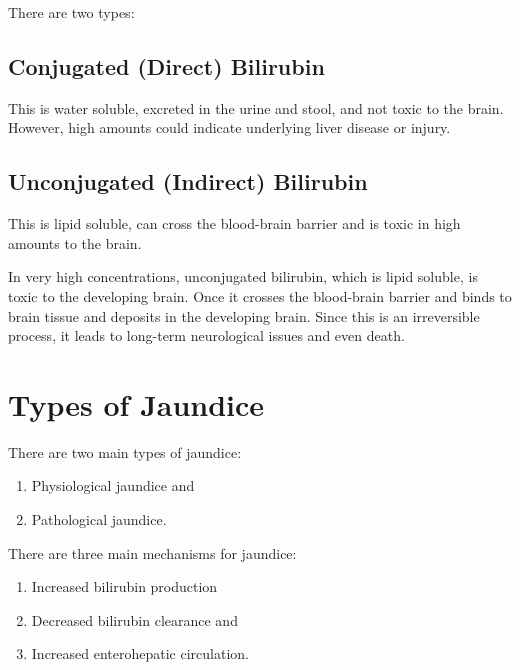 \documentclass[
  letterpaper,
  DIV=11,
  numbers=noendperiod]{scrreprt}
\providecommand{\tightlist}{%
  \setlength{\itemsep}{0pt}\setlength{\parskip}{0pt}}\usepackage{longtable,booktabs,array}
\begin{document}
There are two types:

\hypertarget{conjugated-direct-bilirubin}{%
\subsection{Conjugated (Direct)
Bilirubin}\label{conjugated-direct-bilirubin}}

This is water soluble, excreted in the urine and stool, and not toxic to
the brain. However, high amounts could indicate underlying liver disease
or injury.

\hypertarget{unconjugated-indirect-bilirubin}{%
\subsection{Unconjugated (Indirect)
Bilirubin}\label{unconjugated-indirect-bilirubin}}

This is lipid soluble, can cross the blood-brain barrier and is toxic in
high amounts to the brain.

In very high concentrations, unconjugated bilirubin, which is lipid
soluble, is toxic to the developing brain. Once it crosses the
blood-brain barrier and binds to brain tissue and deposits in the
developing brain. Since this is an irreversible process, it leads to
long-term neurological issues and even death.

\hypertarget{types-of-jaundice}{%
\section{Types of Jaundice}\label{types-of-jaundice}}

There are two main types of jaundice:\\

\begin{enumerate}
\def\labelenumi{\arabic{enumi}.}
\tightlist
\item
  Physiological jaundice and
\item
  Pathological jaundice.
\end{enumerate}

There are three main mechanisms for jaundice:\\

\begin{enumerate}
\def\labelenumi{\arabic{enumi}.}
\tightlist
\item
  Increased bilirubin production
\item
  Decreased bilirubin clearance and
\item
  Increased enterohepatic circulation.
\end{enumerate}
\end{document}
